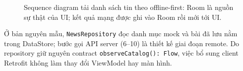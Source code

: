 \begin{figure}[H]
\caption{Sequence diagram tải danh sách tin theo offline-first: Room là nguồn sự thật của UI; kết quả mạng được ghi vào Room rồi mới tới UI.}
\label{fig:seq-news-offline}
\end{figure}

Ở bản nguyên mẫu, \texttt{NewsRepository} đọc danh mục mock và bài đã lưu nằm trong DataStore; bước gọi API server (6--10) là thiết kế giai đoạn remote. Do repository giữ nguyên contract \texttt{observeCatalog(): Flow}, việc bổ sung client Retrofit không làm thay đổi ViewModel hay màn hình.
